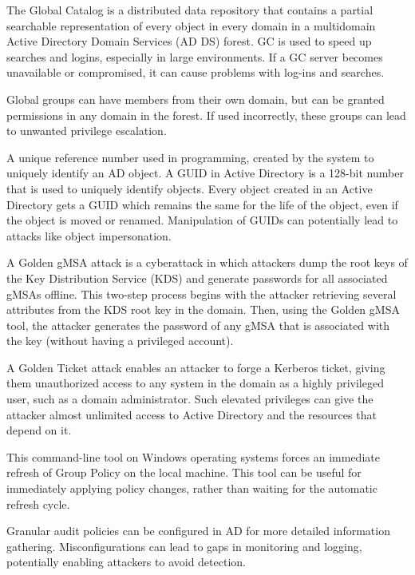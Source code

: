  The Global Catalog is a distributed data repository that contains a partial searchable representation of every object in every domain in a multidomain Active Directory Domain Services (AD DS) forest.  GC is used to speed up searches and logins, especially in large environments. If a GC server becomes unavailable or compromised, it can cause problems with log-ins and searches.

 Global groups can have members from their own domain, but can be granted permissions in any domain in the forest. If used incorrectly, these groups can lead to unwanted privilege escalation.

 A unique reference number used in programming, created by the system to uniquely identify an AD object. A GUID in Active Directory is a 128-bit number that is used to uniquely identify objects. Every object created in an Active Directory gets a GUID which remains the same for the life of the object, even if the object is moved or renamed. Manipulation of GUIDs can potentially lead to attacks like object impersonation. 

 A Golden gMSA attack is a cyberattack in which attackers dump the root keys of the Key Distribution Service (KDS) and generate passwords for all associated gMSAs offline. This two-step process begins with the attacker retrieving several attributes from the KDS root key in the domain. Then, using the Golden gMSA tool, the attacker generates the password of any gMSA that is associated with the key (without having a privileged account).

 A Golden Ticket attack enables an attacker to forge a Kerberos ticket, giving them unauthorized access to any system in the domain as a highly privileged user, such as a domain administrator. Such elevated privileges can give the attacker almost unlimited access to Active Directory and the resources that depend on it. 

 This command-line tool on Windows operating systems forces an immediate refresh of Group Policy on the local machine. This tool can be useful for immediately applying policy changes, rather than waiting for the automatic refresh cycle.

 Granular audit policies can be configured in AD for more detailed information gathering. Misconfigurations can lead to gaps in monitoring and logging, potentially enabling attackers to avoid detection.

